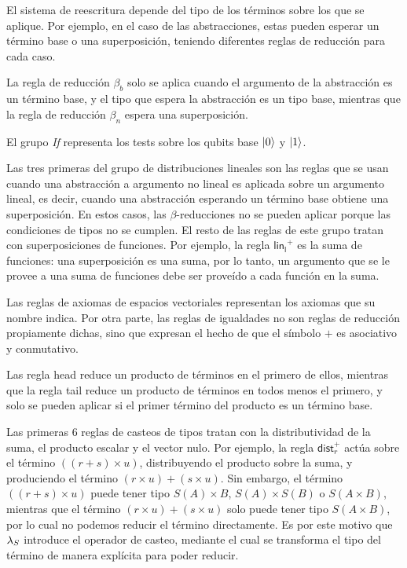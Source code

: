 El sistema de reescritura depende del tipo de los términos sobre los que se aplique. Por ejemplo, en el caso de las abstracciones, estas pueden esperar un término base o una superposición, teniendo diferentes reglas de reducción para cada caso.

La regla de reducción \( \beta_b \) solo se aplica cuando el argumento de la abstracción es un término base, y el tipo que espera la abstracción es un tipo base, mientras que la regla de reducción \( \beta_n \) espera una superposición.

El grupo \textit{If} representa los tests sobre los qubits base \( \ket{0} \) y \( \ket{1} \).

Las tres primeras del grupo de distribuciones lineales son las reglas que se usan cuando una abstracción a argumento no lineal es aplicada sobre un argumento lineal, es decir, cuando una abstracción esperando un término base obtiene una superposición. En estos casos, las \( \beta \)-reducciones no se pueden aplicar porque las condiciones de tipos no se cumplen. El resto de las reglas de este grupo tratan con superposiciones de funciones. Por ejemplo, la regla \( \mathsf{lin_l}^+ \) es la suma de funciones: una superposición es una suma, por lo tanto, un argumento que se le provee a una suma de funciones debe ser proveído a cada función en la suma.

Las reglas de axiomas de espacios vectoriales representan los axiomas que su nombre indica. Por otra parte, las reglas de igualdades no son reglas de reducción propiamente dichas, sino que expresan el hecho de que el símbolo \( + \) es asociativo y conmutativo.

Las regla \textsf{head} reduce un producto de términos en el primero de ellos, mientras que la regla \textsf{tail} reduce un producto de términos en todos menos el primero, y solo se pueden aplicar si el primer término del producto es un término base.

Las primeras 6 reglas de casteos de tipos tratan con la distributividad de la suma, el producto escalar y el vector nulo. Por ejemplo, la regla \( \mathsf{dist}_r^+ \) actúa sobre el término \( ((r + s) \times u) \), distribuyendo el producto sobre la suma, y produciendo el término \( (r \times u) + (s \times u) \). Sin embargo, el término \( ((r + s) \times u) \) puede tener tipo \( S(A) \times B \), \( S(A) \times S(B) \) o \( S(A \times B) \), mientras que el término \( (r \times u) + (s \times u) \) solo puede tener tipo \( S(A \times B) \), por lo cual no podemos reducir el término directamente. Es por este motivo que \( \lambda_S \) introduce el operador de casteo, mediante el cual se transforma el tipo del término de manera explícita para poder reducir.


